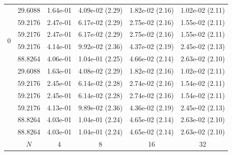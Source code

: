\documentclass[onefignum,onetabnum,final]{siamart250211}
\numberwithin{equation}{section}
\newcommand\0{\boldsymbol{0}}
\begin{document}
\begin{table}[!hbt]
{\begin{tabular}{|c|c|cccc|}
				\hline
				\multirow{6}{0.02\linewidth}{0}&   29.6088 &   1.64e-01  &   4.09e-02 (2.29) &   1.82e-02 (2.16) &   1.02e-02 (2.11)   \\
				&   59.2176 &   2.47e-01  &   6.17e-02 (2.29) &   2.75e-02 (2.16) &   1.55e-02 (2.11)   \\
				&   59.2176 &   2.47e-01  &   6.17e-02 (2.29) &   2.75e-02 (2.16) &   1.55e-02 (2.11)   \\
				&   59.2176 &   4.14e-01  &   9.92e-02 (2.36) &   4.37e-02 (2.19) &   2.45e-02 (2.13)   \\
				&   88.8264 &   4.06e-01  &   1.04e-01 (2.25) &   4.66e-02 (2.14) &   2.63e-02 (2.10)   \\
				\hline
				\multirow{6}{0.02\linewidth}{-1}&   29.6088 &   1.63e-01  &   4.08e-02 (2.29) &   1.82e-02 (2.16) &   1.02e-02 (2.11)   \\
				&   59.2176 &   2.45e-01  &   6.14e-02 (2.28) &   2.74e-02 (2.16) &   1.54e-02 (2.11)   \\
				&   59.2176 &   2.45e-01  &   6.14e-02 (2.28) &   2.74e-02 (2.16) &   1.54e-02 (2.11)   \\
				&   59.2176 &   4.13e-01  &   9.89e-02 (2.36) &   4.36e-02 (2.19) &   2.45e-02 (2.13)   \\
				&   88.8264 &   4.03e-01  &   1.04e-01 (2.24) &   4.65e-02 (2.14) &   2.63e-02 (2.10)   \\
				&   88.8264 &   4.03e-01  &   1.04e-01 (2.24) &   4.65e-02 (2.14) &   2.63e-02 (2.10)   \\
				\hline
				&$N$&4&8&16 &32\\
				\hline
				\hline
		\end{tabular}}
	\end{table}
	
\end{document}
